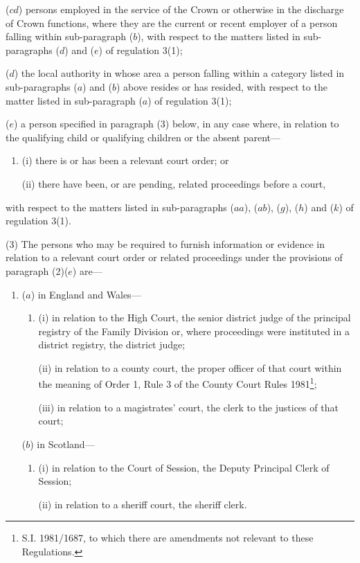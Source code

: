 \documentclass[a4paper]{article}
\begin{document}
\begin{enumerate}
($cd$) persons employed in the service of the Crown or otherwise in the discharge of Crown functions, where they are the current or recent employer of a person falling within sub-paragraph ($b$), with respect to the matters listed in sub-paragraphs ($d$) and ($e$) of regulation 3(1);

($d$) the local authority in whose area a person falling within a category listed in sub-paragraphs ($a$) and ($b$) above resides or has resided, with respect to the matter listed in sub-paragraph ($a$) of regulation 3(1);

($e$) a person specified in paragraph (3) below, in any case where, in relation to the qualifying child or qualifying children or the absent parent—
\begin{enumerate}\item[]
(i) there is or has been a relevant court order; or

(ii) there have been, or are pending, related proceedings before a court,
\end{enumerate}
with respect to the matters listed in sub-paragraphs 
($aa$), ($ab$),  %
($g$), ($h$) and ($k$) of regulation 3(1).
\end{enumerate}

(3) The persons who may be required to furnish information or evidence in relation to a relevant court order or related proceedings under the provisions of paragraph (2)($e$) are—
\begin{enumerate}\item[]
($a$) in England and Wales—
\begin{enumerate}\item[]
(i) in relation to the High Court, the senior district judge of the principal registry of the Family Division or, where proceedings were instituted in a district registry, the district judge;

(ii) in relation to a county court, the proper officer of that court within the meaning of Order 1, Rule 3 of the County Court Rules 1981\footnote{\frenchspacing S.I. 1981/1687, to which there are amendments not relevant to these Regulations.};

(iii) in relation to a magistrates' court, the clerk to the justices of that court;
\end{enumerate}

($b$) in Scotland—
\begin{enumerate}\item[]
(i) in relation to the Court of Session, the Deputy Principal Clerk of Session;

(ii) in relation to a sheriff court, the sheriff clerk.
\end{enumerate}
\end{enumerate}
\end{document}
